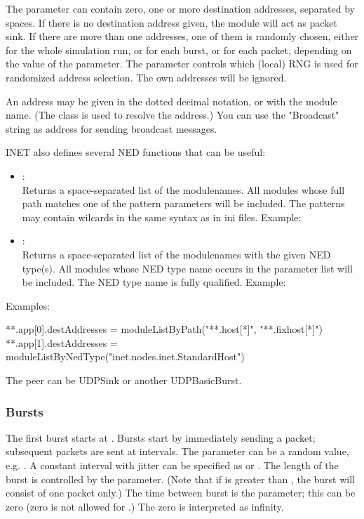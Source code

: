 The  parameter can contain zero, one or more destination
addresses, separated by spaces. If there is no destination address given,
the module will act as packet sink. If there are more than one addresses,
one of them is randomly chosen, either for the whole simulation run,
or for each burst, or for each packet, depending on the value of the
 parameter. The  parameter controls which
(local) RNG is used for randomized address selection.
The own addresses will be ignored.

An address may be given in the dotted decimal notation, or with the module
name. (The  class is used to resolve the address.)
You can use the "Broadcast" string as address for sending broadcast messages.

INET also defines several NED functions that can be useful:

\begin{itemize}
\item {}: \\
         Returns a space-separated list of the modulenames.
         All modules whose full path matches one of the pattern parameters will be included.
         The patterns may contain wilcards in the same syntax as in ini files.
         Example: 
\item {}: \\
         Returns a space-separated list of the modulenames with the given NED type(s).
         All modules whose NED type name occurs in the parameter list will be included.
         The NED type name is fully qualified. Example: 
\end{itemize}

Examples:

\begin{inifile}
**.app[0].destAddresses = moduleListByPath("**.host[*]", "**.fixhost[*]")
**.app[1].destAddresses = moduleListByNedType("inet.nodes.inet.StandardHost")
\end{inifile}

The peer can be UDPSink or another UDPBasicBurst.

\subsubsection*{Bursts}

The first burst starts at . Bursts start by immediately sending
a packet; subsequent packets are sent at  intervals. The
 parameter can be a random value, e.g. .
A constant interval with jitter can be specified as 
or . The length of the burst is controlled by the
 parameter. (Note that if  is greater than
, the burst will consist of one packet only.) The time between
burst is the  parameter; this can be zero (zero is not
allowed for .) The zero  is interpreted as infinity.

